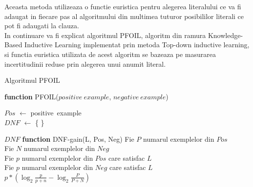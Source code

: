 \documentclass[a4paper,12pt]{report}
\begin{document}
	Aceasta metoda utilizeaza o functie euristica pentru alegerea literalului ce va fi adaugat in fiecare pas al algoritmului din multimea tuturor posibililor literali ce pot fi adaugati la clauza.\\
	In continuare va fi explicat algoritmul PFOIL, algoritm din ramura Knowledge-Based Inductive Learning implementat prin metoda Top-down inductive learning, si functia euristica utilizata de acest algoritm se bazeaza pe masurarea incertitudinii reduse prin alegerea unui anumit literal.

\newpage
\begin{algorithm}
\label{alg:eval}
\caption{Algoritmul PFOIL} \label{eq:2}

\textbf{function} PFOIL($positive\ example$, $negative\ example$)\\

$Pos$ $\leftarrow$ positive\ example\\
$DNF$ $\leftarrow$ \{ \}

\Return $DNF$
\newline
\newline
\textbf{function} DNF-gain(L, Pos, Neg)
	Fie $P$ numarul exemplelor din $Pos$\\
	Fie $N$ numarul exemplelor din $Neg$\\
	Fie $p$ numarul exemplelor din $Pos$ care satisfac $L$\\ 
	Fie $p$ numarul exemplelor din $Neg$ care satisfac $L$\\ 
	\Return $p*(\log_2 \frac{p}{p+n} - \log_2 \frac{P}{P+N})$

\end{algorithm}
\end{document}
